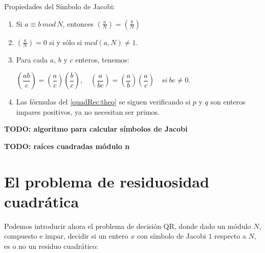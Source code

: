 \begin{theorem}
	Propiedades del Símbolo de Jacobi:
	
	\begin{enumerate}[label=(\roman*)]
		\item Si $a \equiv b \, mod \, N$, entonces $\left( \frac{a}{N} \right) = \left( \frac{b}{N} \right)$
		
		\item 	$\left( \frac{a}{N} \right) = 0$ si y sólo si $mcd(a, N) \neq 1$.
		\item Para cada $a$, $b$ y $c$ enteros, tenemos: \\
		
		\begin{center}
			$
			\left( \dfrac{ab}{c} \right) = \left( \dfrac{a}{c} \right) \left( \dfrac{b}{c} \right), \quad \left( \dfrac{a}{bc} \right) = \left( \dfrac{a}{b} \right) \left( \dfrac{a}{c} \right) \quad si\ bc \neq 0
			$.
		\end{center}
		
		
		
		\item Las fórmulas del \autoref{quadRec:theo} se siguen verificando si $p$ y $q$ son enteros impares positivos, ya no necesitan ser primos.
		
	\end{enumerate}
\end{theorem}


\textbf{TODO: algoritmo para calcular símbolos de Jacobi}

\textbf{TODO: raíces cuadradas módulo n}


\section{El problema de residuosidad cuadrática}

Podemos introducir ahora  el problema de decisión QR, donde dado un módulo $N$, compuesto e impar, decidir si un entero $x$ con símbolo de Jacobi $1$ respecto a $N$, es o no un residuo cuadrático:

